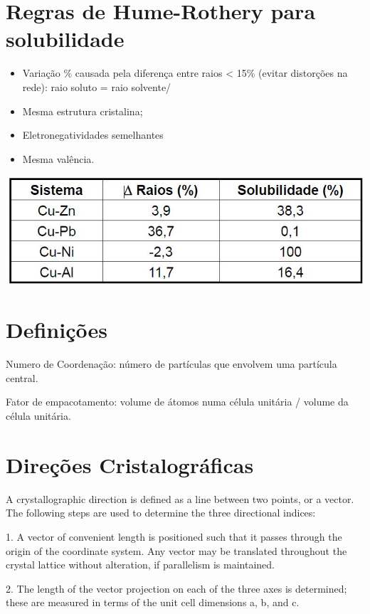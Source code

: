 \section{Regras de Hume-Rothery para solubilidade}

\begin{itemize}
	\item Variação \% causada pela diferença entre raios < 15\% (evitar distorções na rede): raio soluto = raio solvente/
	\item Mesma estrutura cristalina;
	\item Eletronegatividades semelhantes
	\item Mesma valência.
\end{itemize}



\includegraphics[scale=0.27,trim={0 0 0 0}]{figures/hume}

\section{Definições}

Numero de Coordenação: número de partículas que envolvem uma partícula central.

Fator de empacotamento: volume de átomos numa célula unitária / volume da célula unitária.


\section{Direções Cristalográficas}

A crystallographic direction is defined as a line between two points, or a vector. The following steps are used to determine the three directional indices:

1. A vector of convenient length is positioned such that it passes through the
origin of the coordinate system. Any vector may be translated throughout the
crystal lattice without alteration, if parallelism is maintained.

2. The length of the vector projection on each of the three axes is determined;
these are measured in terms of the unit cell dimensions a, b, and c.

